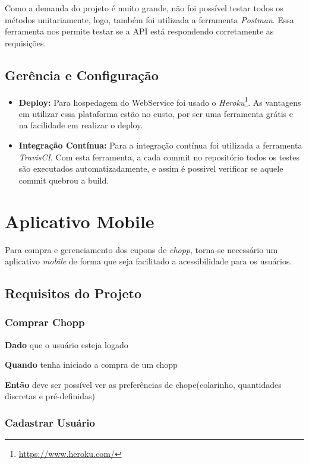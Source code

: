 Como a demanda do projeto é muito grande, não foi possível testar todos os métodos unitariamente, logo,
também foi utilizada a ferramenta \textit{Postman}. Essa ferramenta nos permite testar se a API está respondendo
corretamente as requisições.

\subsection{Gerência e Configuração}

\begin{itemize}
    \item \textbf{Deploy:} Para hospedagem do WebService foi usado o \textit{Heroku}\footnote{\url{https://www.heroku.com/}}.
    As vantagens em utilizar essa plataforma estão no custo, por ser uma ferramenta grátis e na facilidade em realizar o deploy.
    \item \textbf{Integração Contínua:} Para a integração contínua foi utilizada a ferramenta 
    \textit{TravisCI}. Com esta ferramenta, a cada commit no repositório todos os testes são executados
    automatizadamente, e assim é possivel verificar se aquele commit quebrou a build.
\end{itemize}

\section[Aplicativo Mobile]{Aplicativo Mobile}

Para compra e gerenciamento dos cupons de \textit{chopp}, torna-se necessário um aplicativo \textit{mobile} de forma que seja facilitado a acessibilidade para os usuários.

\subsection{Requisitos do Projeto}

\subsubsection{Comprar Chopp}

\textbf{Dado} que o usuário esteja logado

\textbf{Quando} tenha iniciado a compra de um chopp

\textbf{Então} deve ser possível ver as preferências de chope(colarinho, quantidades discretas e pré-definidas)

\subsubsection{Cadastrar Usuário}

